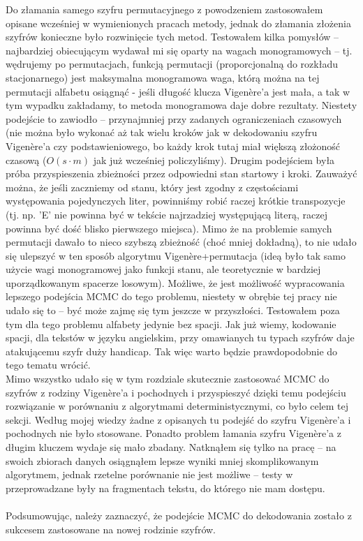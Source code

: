 \documentclass[a4paper]{article}
\theoremstyle{defn}
\theoremstyle{theorem}
\theoremstyle{lemma}
\theoremstyle{cor}
\theoremstyle{fact}
\begin{document}
Do złamania samego szyfru permutacyjnego z powodzeniem zastosowałem opisane wcześniej w wymienionych pracach metody, jednak do złamania złożenia szyfrów konieczne było rozwinięcie tych metod. Testowałem kilka pomysłów – najbardziej obiecującym wydawał mi się oparty na wagach monogramowych – tj. wędrujemy po permutacjach, funkcją permutacji (proporcjonalną do rozkładu stacjonarnego) jest maksymalna monogramowa waga, którą można na tej permutacji alfabetu osiągnąć - jeśli długość klucza Vigenère'a jest mała, a tak w tym wypadku zakładamy, to metoda monogramowa daje dobre rezultaty. Niestety podejście to zawiodło – przynajmniej przy zadanych ograniczeniach czasowych (nie można było wykonać aż tak wielu kroków jak w dekodowaniu szyfru Vigenère'a czy podstawieniowego, bo każdy krok tutaj miał większą złożoność czasową ($O(s \cdot m)$ jak już wcześniej policzyliśmy). Drugim podejściem była próba przyspieszenia zbieżności przez odpowiedni stan startowy i kroki. Zauważyć można, że jeśli zaczniemy od stanu, który jest zgodny z częstościami występowania pojedynczych liter, powinniśmy robić raczej krótkie transpozycje (tj. np. 'E' nie powinna być w tekście najrzadziej występującą literą, raczej powinna być dość blisko pierwszego miejsca). Mimo że na problemie samych permutacji dawało to nieco szybszą zbieżność (choć mniej dokładną), to nie udało się ulepszyć w ten sposób algorytmu Vigenère+permutacja (ideą było tak samo użycie wagi monogramowej jako funkcji stanu, ale teoretycznie w bardziej uporządkowanym spacerze losowym). Możliwe, że jest możliwość wypracowania lepszego podejścia MCMC do tego problemu, niestety w obrębie tej pracy nie udało się to – być może zajmę się tym jeszcze w przyszłości. Testowałem poza tym dla tego problemu alfabety jedynie bez spacji. Jak już wiemy, kodowanie spacji, dla tekstów w języku angielskim, przy omawianych tu typach szyfrów daje atakującemu szyfr duży handicap. Tak więc warto będzie prawdopodobnie do tego tematu wrócić.
\\
Mimo wszystko udało się w tym rozdziale skutecznie zastosować MCMC do szyfrów z rodziny Vigenère'a i pochodnych i przyspieszyć dzięki temu podejściu rozwiązanie w porównaniu z algorytmami deterministycznymi, co było celem tej sekcji. Według mojej wiedzy żadne z opisanych tu podejść do szyfru Vigenère'a i pochodnych nie było stosowane. Ponadto problem łamania szyfru Vigenère'a z długim kluczem wydaje się mało zbadany. Natknąłem się tylko na pracę \cite{other} – na swoich zbiorach danych osiągnąłem lepsze wyniki mniej skomplikowanym algorytmem, jednak rzetelne porównanie nie jest możliwe – testy w \cite{other} przeprowadzane były na fragmentach tekstu, do którego nie mam dostępu. \\\\
Podsumowując, należy zaznaczyć, że podejście MCMC do dekodowania zostało z sukcesem zastosowane na nowej rodzinie szyfrów.
\newpage
\end{document}
